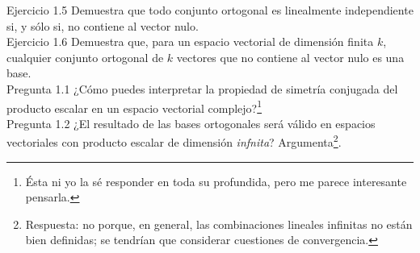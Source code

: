 \documentclass[12pt,dvipsnames]{article}
\numberwithin{equation}{section}
\begin{document}
Ejercicio 1.5 Demuestra que todo conjunto ortogonal es linealmente independiente si, y sólo si, no contiene al vector nulo. \\

Ejercicio 1.6 Demuestra que, para un espacio vectorial de dimensión finita $k$, cualquier conjunto ortogonal de $k$ vectores que no contiene al vector nulo es una base. \\

Pregunta 1.1 ¿Cómo puedes interpretar la propiedad de simetría conjugada del producto escalar en un espacio vectorial complejo?\footnote{Ésta ni yo la sé responder en toda su profundida, pero me parece interesante pensarla.} \\

Pregunta 1.2 ¿El resultado de las bases ortogonales será válido en espacios vectoriales con producto escalar de dimensión \emph{infnita}? Argumenta\footnote{Respuesta: no porque, en general, las combinaciones lineales infinitas no están bien definidas; se tendrían que considerar cuestiones de convergencia.}.
\end{document}
